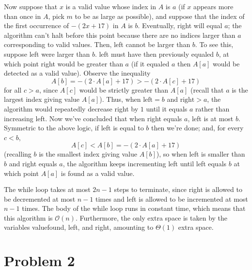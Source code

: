 \documentclass[10pt]{scrartcl}
\begin{document}
Now suppose that $x$ is a valid value whose index in $A$ is $a$
(if $x$ appears more than once in $A$, pick $m$ to be as large as possible),
and suppose that the index of the first occurrence of $-(2x + 17)$ in $A$
is $b$. Eventually, right will equal $a$; the algorithm can't halt
before this point because there are no indices larger than $a$
corresponding to valid values. Then, left cannot be larger than $b$.
To see this, suppose left were larger than $b$.
left must have then previously equaled $b$, at which point
right would be greater than $a$ (if it equaled $a$ then
$A[a]$ would be detected as a valid value).
Observe the inequality
\[A[b] = -(2\cdot A[a] + 17) > -(2\cdot A[c] + 17)\]
for all $c > a$, since $A[c]$ would be strictly greater than $A[a]$
(recall that $a$ is the largest index giving value $A[a]$).
Thus, when $\text{left} = b$ and $\text{right} > a$,
the algorithm would repeatedly decrease right by $1$ until it equals $a$
rather than increasing left.
Now we've concluded that when right equals $a$, left is at most $b$.
Symmetric to the above logic, if left is equal to $b$ then we're done;
and, for every $c < b$,
\[A[c] < A[b] = -(2\cdot A[a] + 17)\]
(recalling $b$ is the smallest index giving value $A[b]$),
so when left is smaller than $b$ and right equals $a$,
the algorithm keeps incrementing left until left equals $b$
at which point $A[a]$ is found as a valid value.

The while loop takes at most $2n-1$ steps to terminate,
since right is allowed to be decremented at most $n-1$ times and
left is allowed to be incremented at most $n-1$ times.
The body of the while loop runs in constant time,
which means that this algorithm is $\mathcal O(n)$.
Furthermore, the only extra space is taken by the variables
valuefound, left, and right, amounting to $\Theta(1)$ extra space.

\pagebreak

\section{Problem 2}
\end{document}
